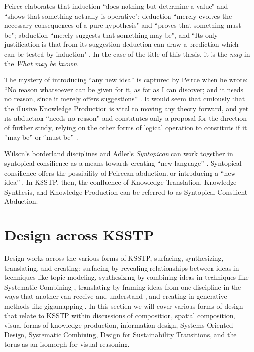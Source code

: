 Peirce elaborates that induction ``does nothing but determine a value"  and ``shows that something actually is operative"; deduction ``merely evolves the necessary consequences of a pure hypothesis" and ``proves that something must be"; abduction ``merely suggests that something may be", and ``Its only justification is that from its suggestion deduction can draw a prediction which can be tested by induction" \citep[p. 106]{peirce_pragmatism_1960}. In the case of the title of this thesis, it is the \textit{may} in the \textit{What may be known}. 


The mystery of introducing “any new idea” \citep[p. 106]{peirce_pragmatism_1960} is captured by Peirce when he wrote: ``No reason whatsoever can be given for it, as far as I can discover; and it needs no reason, since it merely offers suggestions” \citep[p. 106]{peirce_pragmatism_1960}. It would seem that curiously that the illusive Knowledge Production is vital to moving any theory forward, and yet its abduction ``needs no reason” and constitutes only a proposal for the direction of further study, relying on the other forms of logical operation to constitute if it ``may be” or ``must be” \citep[p. 106]{peirce_pragmatism_1960}.

Wilson’s borderland disciplines \citep[p. 12]{wilson_consilience_1999} and Adler’s \textit{Syntopicon} can work together in syntopical consilience as a means towards creating ``new language” \citep[p. 185]{pangaro_design_2011}. Syntopical consilience offers the possibility of Peircean abduction, or introducing a ``new idea” \citep[p/ 106]{peirce_collected_1960}. In KSSTP, then, the confluence of Knowledge Translation, Knowledge Synthesis, and Knowledge Production can be referred to as Syntopical Consilient Abduction.

\section{Design across KSSTP}
\noindent Design works across the various forms of KSSTP, surfacing, synthesizing, translating, and creating: surfacing by revealing relationships between ideas in techniques like topic modeling, synthesizing by combining ideas in techniques like Systematic Combining \citep[p. 554]{dubois_systematic_2002}, translating by framing ideas from one discipline in the ways that another can receive and understand \citep[p. 3]{straus_knowledge_2009-1}, and creating in generative methods like gigamapping \citep{sevaldson_giga-mapping_2011}. In this section we will cover various forms of design that relate to KSSTP within discussions of composition, spatial composition, visual forms of knowledge production, information design, Systems Oriented Design, Systematic Combining, Design for Sustainability Transitions, and the torus as an isomorph for visual reasoning.

